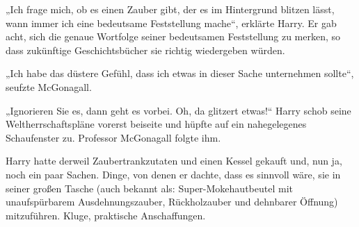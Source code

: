 „Ich frage mich, ob es einen Zauber gibt, der es im Hintergrund blitzen lässt, wann immer ich eine bedeutsame Feststellung mache“, erklärte Harry. Er gab acht, sich die genaue Wortfolge seiner bedeutsamen Feststellung zu merken, so dass zukünftige Geschichtsbücher sie richtig wiedergeben würden.

„Ich habe das düstere Gefühl, dass ich etwas in dieser Sache unternehmen sollte“, seufzte McGonagall.

„Ignorieren Sie es, dann geht es vorbei. Oh, da glitzert etwas!“ Harry schob seine Weltherrschaftspläne vorerst beiseite und hüpfte auf ein nahegelegenes Schaufenster zu. Professor McGonagall folgte ihm.

\later

Harry hatte derweil Zaubertrankzutaten und einen Kessel gekauft und, nun ja, noch ein paar Sachen. Dinge, von denen er dachte, dass es sinnvoll wäre, sie in seiner großen Tasche (auch bekannt als: Super-Mokehautbeutel  mit unaufspürbarem Ausdehnungszauber, Rückholzauber und dehnbarer Öffnung) mitzuführen. Kluge, praktische Anschaffungen.


